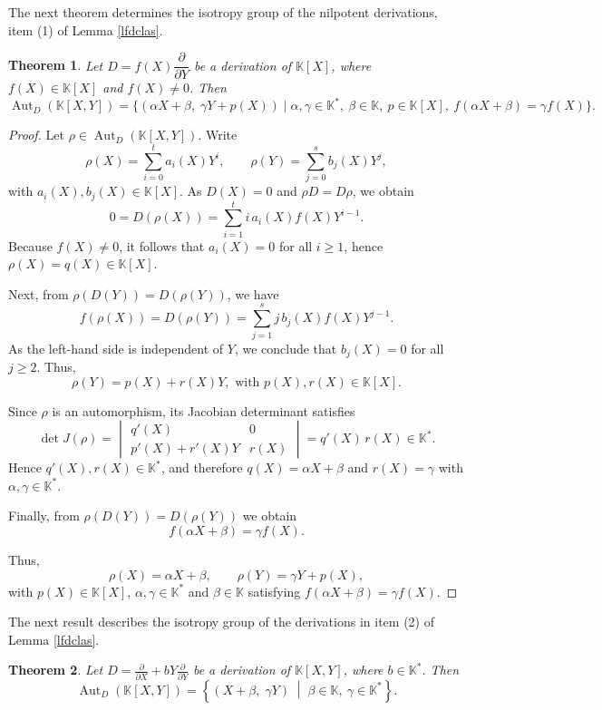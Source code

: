 \documentclass[11pt,a4paper,reqno]{amsart}
\newtheorem{theorem}{Theorem}[section]
\newcommand{\Aut}[0]{\ensuremath{\operatorname{Aut}}}
\begin{document}
The next theorem determines the isotropy group of the nilpotent derivations, item (1) of Lemma \ref{lfdclas}.

\begin{theorem}\label{th3.2}
	Let $D = f(X)\dfrac{\partial}{\partial Y}$ be a derivation of $\mathbb{K}[X]$, where $f(X) \in \mathbb{K}[X]$ and  $f(X)\neq 0$. Then
	\[
	\Aut_D(\mathbb{K}[X,Y])
	=\{(\alpha X+\beta,\; \gamma Y+p(X)) \mid \alpha,\gamma\in\mathbb{K}^*,\ \beta\in\mathbb{K},\ p\in\mathbb{K}[X],\
	f(\alpha X+\beta)=\gamma f(X)\}.
	\]
\end{theorem}

\begin{proof}
	Let $\rho \in \Aut_D(\mathbb{K}[X,Y])$. Write
	\[
	\rho(X)=\sum_{i=0}^t a_i(X)Y^i, 
	\qquad 
	\rho(Y)=\sum_{j=0}^s b_j(X)Y^j,
	\]
	with $a_i(X), b_j(X) \in \mathbb{K}[X]$. As $D(X)=0$ and $\rho D = D\rho$, we obtain
	\[
	0 = D(\rho(X)) = \sum_{i=1}^t i\,a_i(X)f(X)Y^{i-1}.
	\]
	Because $f(X)\neq 0$, it follows that $a_i(X)=0$ for all $i\geq 1$, hence $\rho(X)=q(X)\in\mathbb{K}[X]$.
	
	Next, from $\rho(D(Y)) = D(\rho(Y))$, we have
	\[
	f(\rho(X)) = D(\rho(Y)) = \sum_{j=1}^s j\,b_j(X)f(X)Y^{j-1}.
	\]
	As the left-hand side is independent of $Y$, we conclude that $b_j(X)=0$ for all $j\geq 2$. Thus,
	\[
	\rho(Y)=p(X)+r(X)Y, \mbox{ with } p(X), r(X)\in\mathbb{K}[X].
	\]
	
	Since $\rho$ is an automorphism, its Jacobian determinant satisfies
	\[
	\det J(\rho) =
	\begin{vmatrix}
		q'(X) & 0 \\
		p'(X)+r'(X)Y & r(X)
	\end{vmatrix}
	= q'(X)\,r(X) \in \mathbb{K}^*.
	\]
	Hence $q'(X), r(X) \in \mathbb{K}^*$, and therefore $q(X)=\alpha X+\beta$ and $r(X)=\gamma$ with $\alpha,\gamma\in\mathbb{K}^*$.
	
	Finally, from $\rho(D(Y))=D(\rho(Y))$ we obtain
	\[
	f(\alpha X+\beta)=\gamma f(X).
	\]
	
	Thus,
	\[
	\rho(X)=\alpha X+\beta, \qquad \rho(Y)=\gamma Y+p(X),
	\]
	with $p(X)\in\mathbb{K}[X]$, $\alpha,\gamma\in\mathbb{K}^*$ and $\beta\in\mathbb{K}$ satisfying $f(\alpha X+\beta)=\gamma f(X)$.
\end{proof}

The next result describes the isotropy group of the derivations in item (2) of Lemma \ref{lfdclas}.

\begin{theorem}\label{th3.3}
Let $D = \frac{\partial}{\partial X} + bY \frac{\partial}{\partial Y}$ be a derivation of $\mathbb{K}[X,Y]$, where $b \in \mathbb{K}^*$.
Then
    \[
    \operatorname{Aut}_D(\mathbb{K}[X,Y]) = \left\{ (X + \beta,\; \gamma Y) \;\middle|\; \beta \in \mathbb{K},\ \gamma\in \mathbb{K}^* \right\}.
    \]
 \end{theorem}
\end{document}
